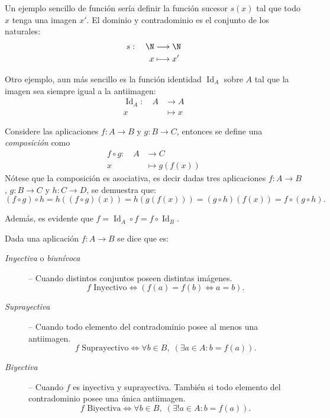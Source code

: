 \documentclass[11pt,oneside,a4paper]{book}
\DeclareMathOperator{\Id}{Id}
\begin{document}
Un ejemplo sencillo de función sería definir la función sucesor $s(x)$ tal que todo $x$ tenga una imagen $x'$. El dominio y contradominio es el conjunto de los naturales:
\begin{align*}
s:\quad \N&\longrightarrow\N\\
x&\longmapsto x'
\end{align*}

Otro ejemplo, aun más sencillo es la función identidad $\Id_A$ sobre $A$ tal que la imagen sea siempre igual a la antiimagen:
\begin{align*}
\Id_A:\quad A&\longrightarrow A\\
x&\longmapsto x
\end{align*}

Considere las aplicaciones $f:A\rightarrow B$ y $g:B\rightarrow C$, entonces se define una \textit{composición} como
\begin{align*}
f\circ g:\quad A&\longrightarrow C\\
x&\longmapsto g(f(x))
\end{align*}
Nótese que la composición es asociativa, es decir dadas tres aplicaciones $f:A\rightarrow B$, $g:B\rightarrow C$ y $h:C\rightarrow D$, se demuestra que:
$$(f\circ g)\circ h=h((f\circ g)(x))=h(g(f(x)))=(g\circ h)(f(x))=f\circ(g\circ h).$$
\begin{figure}
\centering
{}
\end{figure}
Además, es evidente que $f=\Id_A\circ f=f\circ\Id_B$.

\begin{mydef}
Dada una aplicación $f:A\rightarrow B$ se dice que es:
\begin{description}
\item[{\it Inyectiva} o {\it biunívoca}] -- Cuando distintos conjuntos poseen distintas imágenes.
$$\text{$f$ Inyectivo}\iff(f(a)=f(b)\iff a=b).$$
\item[\it Suprayectiva] -- Cuando todo elemento del contradominio posee al menos una antiimagen.
$$\text{$f$ Suprayectivo}\iff\forall b\in B,\;(\exists a\in A:b=f(a)).$$
\item[\it Biyectiva] -- Cuando $f$ es inyectiva y suprayectiva. También si todo elemento del contradominio posee una única antiimagen.
$$\text{$f$ Biyectiva}\iff\forall b\in B,\;(\exists!a\in A:b=f(a)).$$
\end{description}
\end{mydef}
\end{document}
